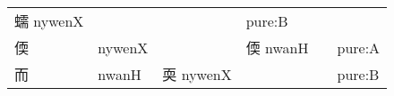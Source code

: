 \documentclass[14pt,a4paper]{scrartcl}
\begin{document}
\begin{longtable}[c]{@{}llllll@{}}
\begin{minipage}[t]{0.14\columnwidth}\raggedright\strut
蠕 nywenX
\strut\end{minipage} &
\begin{minipage}[t]{0.14\columnwidth}\raggedright\strut
\strut\end{minipage} &
\begin{minipage}[t]{0.14\columnwidth}\raggedright\strut
\strut\end{minipage} &
\begin{minipage}[t]{0.14\columnwidth}\raggedright\strut
pure:B
\strut\end{minipage}\tabularnewline
\begin{minipage}[t]{0.14\columnwidth}\raggedright\strut
偄
\strut\end{minipage} &
\begin{minipage}[t]{0.14\columnwidth}\raggedright\strut
nywenX
\strut\end{minipage} &
\begin{minipage}[t]{0.14\columnwidth}\raggedright\strut
\strut\end{minipage} &
\begin{minipage}[t]{0.14\columnwidth}\raggedright\strut
偄 nwanH
\strut\end{minipage} &
\begin{minipage}[t]{0.14\columnwidth}\raggedright\strut
\strut\end{minipage} &
\begin{minipage}[t]{0.14\columnwidth}\raggedright\strut
pure:A
\strut\end{minipage}\tabularnewline
\begin{minipage}[t]{0.14\columnwidth}\raggedright\strut
而
\strut\end{minipage} &
\begin{minipage}[t]{0.14\columnwidth}\raggedright\strut
nwanH
\strut\end{minipage} &
\begin{minipage}[t]{0.14\columnwidth}\raggedright\strut
耎 nywenX
\strut\end{minipage} &
\begin{minipage}[t]{0.14\columnwidth}\raggedright\strut
\strut\end{minipage} &
\begin{minipage}[t]{0.14\columnwidth}\raggedright\strut
\strut\end{minipage} &
\begin{minipage}[t]{0.14\columnwidth}\raggedright\strut
pure:B
\strut\end{minipage}\tabularnewline
\bottomrule
\end{longtable}
\end{document}
